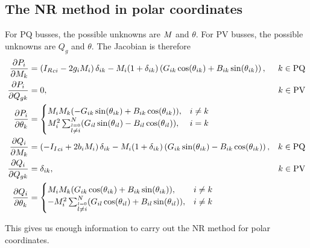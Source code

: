 \documentclass[11pt]{article}
\newcommand{\Ir}{{I_R}}
\newcommand{\Ii}{{I_I}}
\begin{document}
\subsection{The NR method in polar coordinates}
For PQ busses, the possible unknowns are $M_{}$ and $\theta$. For PV busses, the possible unknowns are $Q_g$ and $\theta$. The Jacobian is therefore
\begin{align}
	\frac{\partial P_i}{\partial \M{k}} &= \left(\Ir_{ci} - 2g_i\M{i}\right)\delta_{ik} - \M{i}(1 + \delta_{ik})\left(G_{ik}\cs{ik} + B_{ik}\sn{ik}\right), & k \in \text{PQ} \notag \\
	\frac{\partial P_i}{\partial Q_{gk}} &= 0, &k \in \text{PV}\notag \\
	\frac{\partial P_i}{\partial \theta_k} &=
		\begin{cases}
			\M{i}\M{k}(-G_{ik}\sn{ik} + B_{ik}\cs{ik}), &i \ne k \\
			\M{i}^2\sum_{\stackrel{l = 0}{l \ne i}}^N(G_{il}\sn{il} - B_{il}\cs{il}), &i = k
		\end{cases} \notag \\
	\frac{\partial Q_i}{\partial \M{k}} &= \left(-\Ii_{ci} + 2b_i\M{i}\right)\delta_{ik} - \M{i}(1 + \delta_{ik})\left(G_{ik}\sn{ik} - B_{ik}\cs{ik}\right), & k \in \text{PQ} \notag \\
	\frac{\partial Q_i}{\partial Q_{gk}} &= \delta_{ik}, & k \in \text{PV} \notag \\
	\frac{\partial Q_i}{\partial \theta_k} &= 
		\begin{cases}
			\M{i}\M{k}(G_{ik}\cs{ik} + B_{ik}\sn{ik}), & i \ne k \\
			-\M{i}^2\sum_{\stackrel{l = 0}{l \ne i}}^N(G_{il}\cs{il} + B_{il}\sn{il}), & i \ne k \\
		\end{cases}
\end{align}

This gives us enough information to carry out the NR method for polar coordinates.
\end{document}
